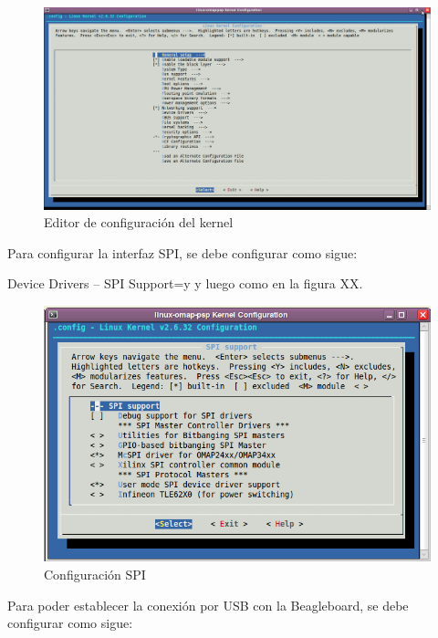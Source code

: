 \begin{figure}[H]
\centering
  \begin{center}
  \includegraphics[scale=.3]{Imagenes/kernel.png} 
  \end{center}
  \caption{Editor de configuración del kernel}\label{Fig:kernel} 
\end{figure}

Para configurar la interfaz SPI, se debe configurar como sigue:

Device Drivers – SPI Support=y y luego como en la figura XX.

\begin{figure}[H]
\centering
  \begin{center}
  \includegraphics[scale=.4]{Imagenes/spi_chica.png} 
  \end{center}
  \caption{Configuración SPI}\label{Fig:spi} 
\end{figure}


Para poder establecer la conexión por USB con la Beagleboard, se debe configurar como sigue: 

